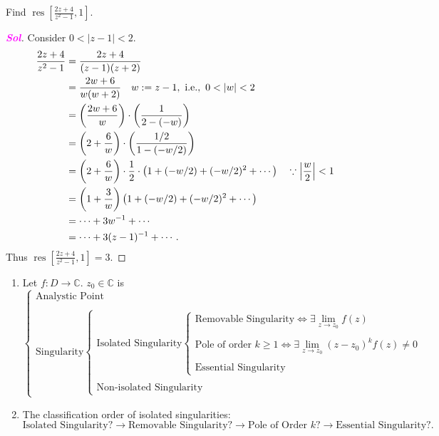 \documentclass{article}
\newcommand{\ie}{\textnormal{i.e.}}
\theoremstyle{definition}
\newcommand{\C}{\mathbb{C}}
\newcommand{\of}[1]{\left( #1 \right)}
\newcommand{\abs}[1]{\left\lvert #1 \right\rvert}
\newcommand{\sol}{\textcolor{magenta}{\bf Sol}}
\newcommand{\res}{\operatorname{res}}
\begin{document}
\begin{tcolorbox}[colback=white,colframe=white,arc=5pt,title={\color{black}\bf $\bullet$ Residue}]
	Find $\displaystyle \res\left[\frac{2z+4}{z^2-1},1\right]$. 
\end{tcolorbox}
\begin{proof}[\sol]
	Consider $0<\abs{z-1}<2$. \begin{align*}
		\frac{2z+4}{z^2-1}&=\frac{2z+4}{(z-1)(z+2)}\\
		&=\frac{2w+6}{w(w+2)}\quad w:=z-1,\ \ie,\ 0<\abs{w}<2 \\
		&=\of{\frac{2w+6}{w}}\cdot\of{\frac{1}{2-(-w)}}\\
		&=\of{2+\frac{6}{w}}\cdot\of{\frac{1/2}{1-(-w/2)}}\\
		&=\of{2+\frac{6}{w}}\cdot\frac{1}{2}\cdot\of{1+(-w/2)+(-w/2)^2+\cdots}\quad\because\abs{\frac{w}{2}}<1\\
		&=\of{1+\frac{3}{w}}\of{1+(-w/2)+(-w/2)^2+\cdots}\\
		&=\cdots+3w^{-1}+\cdots\\
		&=\cdots+3(z-1)^{-1}+\cdots.
	\end{align*}
	Thus $\displaystyle\res\left[\frac{2z+4}{z^2-1},1\right]=3.$
\end{proof}
\vspace{8pt}
\begin{tcolorbox}[colback=white,colframe=black,arc=5pt,title={\color{white}\bf Classification of Singularities}]
	\begin{enumerate}[(1)]
		\item Let $f:D\to\C$. $z_0\in\C$ is \[
		\begin{cases}
			\text{Analystic Point}\\
			\\
			\text{Singularity}\begin{cases}
				\text{Isolated Singularity}
				\begin{cases}
					\text{Removable Singularity}\iff\exists\lim\limits_{z\to z_0} f(z)\\
					\\
					\text{Pole of order $k\geq 1$}\iff\exists\lim\limits_{z\to z_0}(z-z_0)^kf(z)\neq 0\\
					\\
					\text{Essential Singularity}
				\end{cases}
				\\
				\\
				\text{Non-isolated Singularity}
			\end{cases}
		\end{cases}
		\]
		\item The classification order of isolated singularities: \[
		\text{Isolated Singularity}?\longrightarrow\text{Removable Singularity}?\longrightarrow\text{Pole of Order $k$}?\longrightarrow\text{Essential Singularity}?.
		\]
	\end{enumerate}
\end{tcolorbox}
\end{document}
